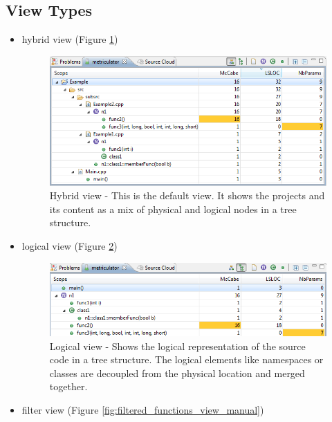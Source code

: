 \documentclass[11pt,a4paper,oneside]{scrreprt}
\begin{document}
\subsection{View Types}
\begin{itemize}
\item hybrid view (Figure \ref{fig:hybrid_view_manual})
\begin{figure}[th]
\begin{center}
\includegraphics[scale=0.8]{figures/hybrid_view.png}
\end{center}
\caption{Hybrid view - This is the default view. It shows the projects and its content as a mix of physical and logical nodes in a tree structure.}
\label{fig:hybrid_view_manual}
\end{figure}
\item logical view (Figure \ref{fig:logical_view_manual})
\begin{figure}[th]
\begin{center}
\includegraphics[scale=0.8]{figures/logical_view.png}
\end{center}
\caption{Logical view - Shows the logical representation of the source code in a tree structure. The logical elements like namespaces or classes are decoupled from the physical location and merged together.}
\label{fig:logical_view_manual}
\end{figure}
\item filter view (Figure \ref{fig:filtered_functions_view_manual})
\begin{figure}[th]
\begin{center}

\end{center}
\end{figure}
\end{itemize}
\end{document}
